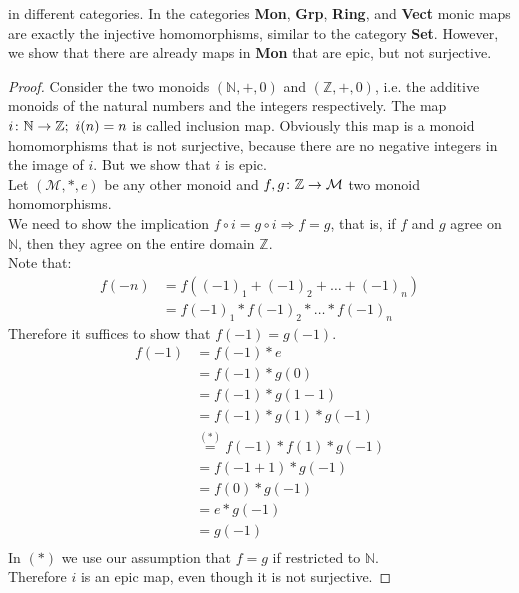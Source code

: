 in different categories.
In the categories \textbf{Mon}, \textbf{Grp}, \textbf{Ring}, and \textbf{Vect}
monic maps are exactly the injective homomorphisms,
similar to the category \textbf{Set}.
However, we show that there are already maps in \textbf{Mon} that are epic, but not surjective.
\begin{proof}
  Consider the two monoids $(\mathbb{N}, +, 0)$ and $(\mathbb{Z}, +, 0)$, i.e. the
  additive monoids of the natural numbers and the integers respectively.
  The map $i \from \mathbb{N} \to \mathbb{Z}; \ i(n) = n$ is called inclusion map.
  Obviously this map is a monoid homomorphisms that is not surjective,
  because there are no negative integers in the image of $i$.
  But we show that $i$ is epic.\\
  Let $(\mathcal{M}, *, e)$ be any other monoid and $f, g \from \mathbb{Z} \to \mathcal{M}$ two
  monoid homomorphisms.\\
  We need to show the implication $f \circ i = g \circ i \Rightarrow f = g$, that is,
  if $f$ and $g$ agree on $\mathbb{N}$, then they agree on the entire domain $\mathbb{Z}$.\\
  Note that:
  \begin{align*}
    f(-n) &= f ((-1)_1 + (-1)_2 + \dots + (-1)_n)\\
          &= f(-1)_1 * f(-1)_2 * \dots * f(-1)_n
  \end{align*}
  Therefore it suffices to show that $f(-1) = g(-1)$.
  \begin{align*}
    f(-1) &= f(-1) * e \\
          &= f(-1) * g(0) \\
          &= f(-1) * g(1 - 1) \\
          &= f(-1) * g(1) * g(-1) \\
          &\overset{(*)}{=} f(-1) * f(1) * g(-1) \\
          &= f(-1 + 1) * g(-1) \\
          &= f(0) * g(-1) \\
          &= e * g(-1) \\
          &= g(-1) \\ 
  \end{align*}
  In $(*)$ we use our assumption that $f=g$ if restricted to $\mathbb{N}$.\\
  Therefore $i$ is an epic map, even though it is not surjective.
\end{proof}

